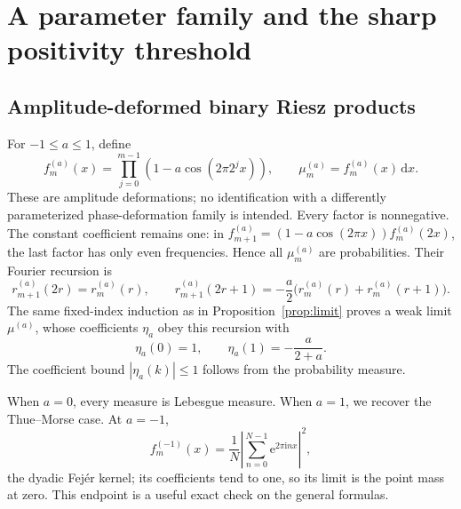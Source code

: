\documentclass[11pt,a4paper]{article}
\numberwithin{equation}{section}
\theoremstyle{definition}
\theoremstyle{remark}
\newcommand{\dd}{\,\mathrm d}
\newcommand{\ee}{\mathrm e}
\newcommand{\ii}{\mathrm i}
\begin{document}
\section{A parameter family and the sharp positivity threshold}
\label{sec:parameter}

\subsection{Amplitude-deformed binary Riesz products}
For $-1\le a\le1$, define
\begin{equation}
 f_m^{(a)}(x)=\prod_{j=0}^{m-1}(1-a\cos(2\pi2^jx)),\qquad
 \mu_m^{(a)}=f_m^{(a)}(x)\dd x.
 \label{eq:parameter-product}
\end{equation}
These are amplitude deformations; no identification with a differently
parameterized phase-deformation family is intended. Every factor is nonnegative.
The constant coefficient remains one: in
$f_{m+1}^{(a)}=(1-a\cos(2\pi x))f_m^{(a)}(2x)$, the last factor has only even
frequencies. Hence all $\mu_m^{(a)}$ are probabilities. Their Fourier recursion is
\begin{equation}
 r_{m+1}^{(a)}(2r)=r_m^{(a)}(r),\qquad
 r_{m+1}^{(a)}(2r+1)=-\frac a2\bigl(r_m^{(a)}(r)+r_m^{(a)}(r+1)\bigr).
 \label{eq:parameter-rec}
\end{equation}
The same fixed-index induction as in Proposition~\ref{prop:limit} proves a weak
limit $\mu^{(a)}$, whose coefficients $\eta_a$ obey this recursion with
\begin{equation}
 \eta_a(0)=1,\qquad \eta_a(1)=-\frac a{2+a}.
 \label{eq:parameter-eta}
\end{equation}
The coefficient bound $|\eta_a(k)|\le1$ follows from the probability measure.

When $a=0$, every measure is Lebesgue measure. When $a=1$, we recover the
Thue--Morse case. At $a=-1$,
\begin{equation}
 f_m^{(-1)}(x)=\frac1N\left|\sum_{n=0}^{N-1}\ee^{2\pi\ii nx}\right|^2,
 \label{eq:Fejer}
\end{equation}
the dyadic Fej\'er kernel; its coefficients tend to one, so its limit is the point
mass at zero. This endpoint is a useful exact check on the general formulas.
\end{document}
